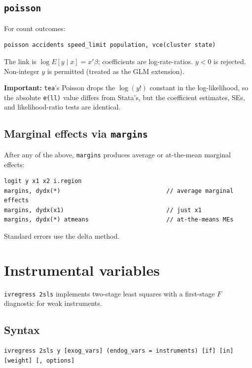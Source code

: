 \documentclass[11pt,letterpaper]{article}
\begin{document}
\subsection{\texttt{poisson}}

For count outcomes:

\begin{lstlisting}
poisson accidents speed_limit population, vce(cluster state)
\end{lstlisting}

The link is $\log E[y \mid x] = x'\beta$; coefficients are
log-rate-ratios.  $y < 0$ is rejected.  Non-integer $y$ is permitted
(treated as the GLM extension).

\textbf{Important:} \texttt{tea}'s Poisson drops the $\log(y!)$ constant
in the log-likelihood, so the absolute \texttt{e(ll)} value differs from
Stata's, but the coefficient estimates, SEs, and likelihood-ratio
tests are identical.

\subsection{Marginal effects via \texttt{margins}}

After any of the above, \texttt{margins} produces average or
at-the-mean marginal effects:

\begin{lstlisting}
logit y x1 x2 i.region
margins, dydx(*)                              // average marginal effects
margins, dydx(x1)                             // just x1
margins, dydx(*) atmeans                      // at-the-means MEs
\end{lstlisting}

Standard errors use the delta method.

\section{Instrumental variables}

\texttt{ivregress 2sls} implements two-stage least squares with a
first-stage $F$ diagnostic for weak instruments.

\subsection{Syntax}

\begin{lstlisting}
ivregress 2sls y [exog_vars] (endog_vars = instruments) [if] [in] [weight] [, options]
\end{lstlisting}
\end{document}
